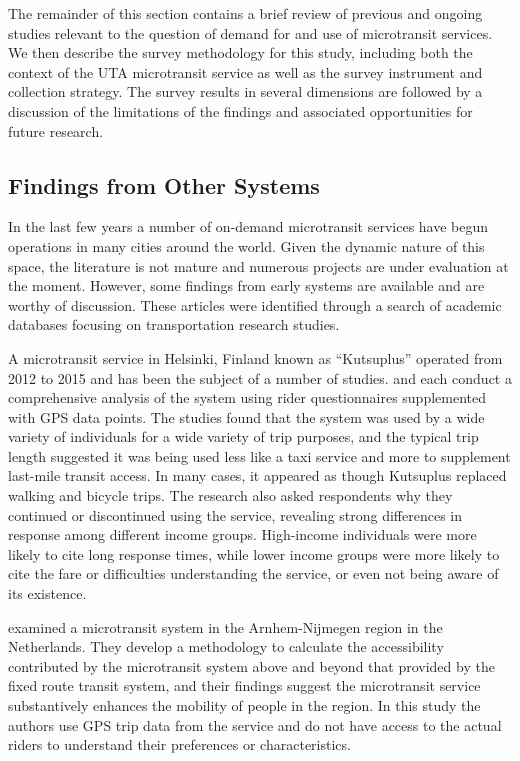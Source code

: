 \documentclass[smartcities,article,submit,moreauthors,pdftex]{Definitions/mdpi}
\begin{document}
The remainder of this section contains a brief review of previous and ongoing studies relevant to the question of demand for and use of microtransit services. We then describe the survey methodology for this study, including both the context of the UTA microtransit service as well as the survey instrument and collection strategy. The survey results in several dimensions are followed by a discussion of the limitations of the findings and associated opportunities for future research.

\subsection{Findings from Other Systems}
In the last few years a number of on-demand microtransit services have begun operations in many cities around the world. Given the dynamic nature of this space, the literature is not mature and numerous projects are under evaluation at the moment. However, some findings from early systems are available and are worthy of discussion. These articles were identified through a search of academic databases focusing on transportation research studies.

A microtransit service in Helsinki, Finland known as “Kutsuplus” operated from 2012 to 2015 and has been the subject of a number of studies. \citet{weckstrom2018} and \citet{Haglund2019} each conduct a comprehensive analysis of the system using rider questionnaires supplemented with GPS data points. The studies found that the system was used by a wide variety of individuals for a wide variety of trip purposes, and the typical trip length suggested it was being used less like a taxi service and more to supplement last-mile transit access. In many cases, it appeared as though Kutsuplus replaced walking and bicycle trips. The \citeauthor{weckstrom2018} research also asked respondents why they continued or discontinued using the service, revealing strong differences in response among different income groups. High-income individuals were more likely to cite long response times, while lower income groups were more likely to cite the fare or difficulties understanding the service, or even not being aware of its existence.

\citet{alonso2018} examined a microtransit system in the Arnhem-Nijmegen region in the Netherlands. They develop a methodology to calculate the accessibility contributed by the microtransit system above and beyond that provided by the fixed route transit system, and their findings suggest the microtransit service substantively enhances the mobility of people in the region. In this study the authors use GPS trip data from the service and do not have access to the actual riders to understand their preferences or characteristics.
\end{document}
